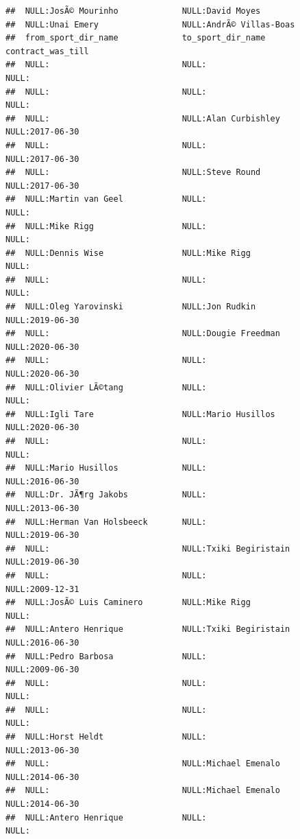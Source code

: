 \documentclass{article}\usepackage[]{graphicx}\usepackage[]{color}
\makeatletter
\newenvironment{kframe}{%
 \def\at@end@of@kframe{}%
 \ifinner\ifhmode%
  \def\at@end@of@kframe{\end{minipage}}%
  \begin{minipage}{\columnwidth}%
 \fi\fi%
 \def\FrameCommand##1{\hskip\@totalleftmargin \hskip-\fboxsep
 \colorbox{shadecolor}{##1}\hskip-\fboxsep
     \hskip-\linewidth \hskip-\@totalleftmargin \hskip\columnwidth}%
 \MakeFramed {\advance\hsize-\width
   \@totalleftmargin\z@ \linewidth\hsize
   \@setminipage}}%
 {\par\unskip\endMakeFramed%
 \at@end@of@kframe}
\newenvironment{knitrout}{}{} %
\makeatother
\begin{document}
\begin{knitrout}
\begin{kframe}
\begin{verbatim}
##  NULL:JosÃ© Mourinho             NULL:David Moyes             
##  NULL:Unai Emery                 NULL:AndrÃ© Villas-Boas      
##  from_sport_dir_name             to_sport_dir_name             contract_was_till
##  NULL:                           NULL:                         NULL:            
##  NULL:                           NULL:                         NULL:            
##  NULL:                           NULL:Alan Curbishley          NULL:2017-06-30  
##  NULL:                           NULL:                         NULL:2017-06-30  
##  NULL:                           NULL:Steve Round              NULL:2017-06-30  
##  NULL:Martin van Geel            NULL:                         NULL:            
##  NULL:Mike Rigg                  NULL:                         NULL:            
##  NULL:Dennis Wise                NULL:Mike Rigg                NULL:            
##  NULL:                           NULL:                         NULL:            
##  NULL:Oleg Yarovinski            NULL:Jon Rudkin               NULL:2019-06-30  
##  NULL:                           NULL:Dougie Freedman          NULL:2020-06-30  
##  NULL:                           NULL:                         NULL:2020-06-30  
##  NULL:Olivier LÃ©tang            NULL:                         NULL:            
##  NULL:Igli Tare                  NULL:Mario Husillos           NULL:2020-06-30  
##  NULL:                           NULL:                         NULL:            
##  NULL:Mario Husillos             NULL:                         NULL:2016-06-30  
##  NULL:Dr. JÃ¶rg Jakobs           NULL:                         NULL:2013-06-30  
##  NULL:Herman Van Holsbeeck       NULL:                         NULL:2019-06-30  
##  NULL:                           NULL:Txiki Begiristain        NULL:2019-06-30  
##  NULL:                           NULL:                         NULL:2009-12-31  
##  NULL:JosÃ© Luis Caminero        NULL:Mike Rigg                NULL:            
##  NULL:Antero Henrique            NULL:Txiki Begiristain        NULL:2016-06-30  
##  NULL:Pedro Barbosa              NULL:                         NULL:2009-06-30  
##  NULL:                           NULL:                         NULL:            
##  NULL:                           NULL:                         NULL:            
##  NULL:Horst Heldt                NULL:                         NULL:2013-06-30  
##  NULL:                           NULL:Michael Emenalo          NULL:2014-06-30  
##  NULL:                           NULL:Michael Emenalo          NULL:2014-06-30  
##  NULL:Antero Henrique            NULL:                         NULL:            

\end{verbatim}
\end{kframe}
\end{knitrout}
\end{document}
